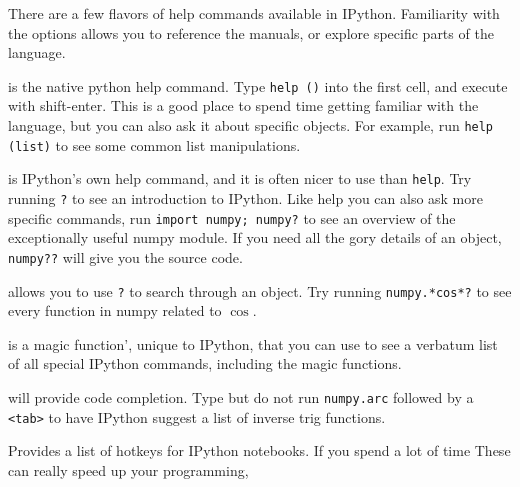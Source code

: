 \documentclass[justified, nobib]{tufte-handout}
\begin{document}
\smallskip
\noindent
There are a few flavors of help commands available in IPython. Familiarity with
the options allows you to reference the manuals, or explore specific parts of
the language.   \\
\begin{description}[font=\tt, leftmargin=0cm]
\item[help ()] is the native python help command. Type \texttt{help ()} into
  the first cell, and execute with shift-enter. This is a good place to spend
  time getting familiar with the language, but you can also ask it about
  specific objects. For example, run \texttt{help (list)} to see some common
  list manipulations.
\item[?] is IPython's own help command, and it is often nicer to use than
  \texttt{help}. Try running \texttt{?} to see an introduction to IPython. Like
  help you can also ask more specific commands, run \texttt{import numpy;
    numpy?} to see an overview of the exceptionally useful numpy module. If you
  need all the gory details of an object, \texttt{numpy??} will give you the
  source code.
\item[<regex>?] allows you to use \texttt{?} to search through an object. Try
  running \texttt{numpy.*cos*?} to see every function in numpy related to
  $\cos$.
\item[\%quickref] is a magic function', unique to IPython, that you can use to
  see a verbatum list of all special IPython commands, including the magic
  functions.
\item[<tab>] will provide code completion. Type but do not run
  \texttt{numpy.arc} followed by a \texttt{<tab>} to have IPython suggest a
  list of inverse trig functions.
\item[Control-m h] Provides a list of hotkeys for IPython notebooks. If you
  spend a lot of time These can
  really speed up your programming,
\end{description}
\end{document}
